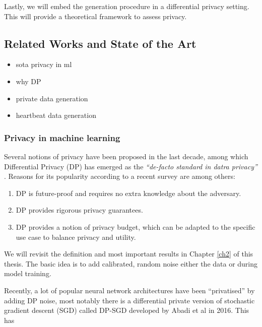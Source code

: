 Lastly, we will embed the generation procedure in a differential privacy setting. This will provide a theoretical framework to assess privacy.

\subsection{Related Works and State of the Art}
\begin{itemize}
    \item sota privacy in ml 
    \item why DP
    \item private data generation
    \item heartbeat data generation
\end{itemize}
\subsubsection*{Privacy in machine learning}
Several notions of privacy have been proposed in the last decade, among which Differential Privacy (DP) has emerged as the \textit{``de-facto standard in datra privacy''} \parencite{kim2021survey}. Reasons for its popularity according to a recent survey \parencite{surv_dp2021} are among others:

\begin{enumerate}
    \item DP is future-proof and requires no extra knowledge about the adversary.
    \item DP provides rigorous privacy guarantees.
    \item DP provides a notion of privacy budget, which can be adapted to the specific use case to balance privacy and utility.
\end{enumerate}

We will revisit the definition and most important results in Chapter \ref{ch2} of this thesis. The basic idea is to add calibrated, random noise either the data or during model training.

Recently, a lot of popular neural network architectures have been ``privatised'' by adding DP noise, most notably there is a differential private version of stochastic gradient descent (SGD) called DP-SGD developed by Abadi et al \parencite{Abadi_2016} in 2016. This has 

